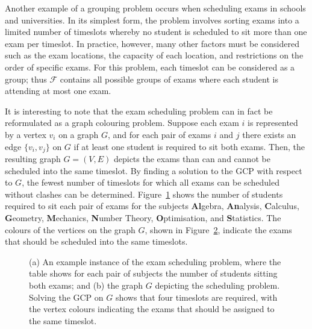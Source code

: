 \documentclass[a4paper,11pt]{article}
\begin{document}
Another example of a grouping problem occurs when scheduling exams in schools and universities. In its simplest form, the problem involves sorting exams into a limited number of timeslots whereby no student is scheduled to sit more than one exam per timeslot. In practice, however, many other factors must be considered such as the exam locations, the capacity of each location, and restrictions on the order of specific exams. For this problem, each timeslot can be considered as a group; thus $\mathcal{F}$ contains all possible groups of exams where each student is attending at most one exam.

It is interesting to note that the exam scheduling problem can in fact be reformulated as a graph colouring problem. Suppose each exam $i$ is represented by a vertex $v_i$ on a graph $G$, and for each pair of exams $i$ and $j$ there exists an edge $\{v_i, v_j\}$ on $G$ if at least one student is required to sit both exams. Then, the resulting graph $G = (V, E)$ depicts the exams than can and cannot be scheduled into the same timeslot. By finding a solution to the GCP with respect to $G$, the fewest number of timeslots for which all exams can be scheduled without clashes can be determined. Figure~\ref{fig:exams} shows the number of students required to sit each pair of exams for the subjects \textbf{Al}gebra, \textbf{An}alysis, \textbf{C}alculus, \textbf{G}eometry, \textbf{M}echanics, \textbf{N}umber Theory, \textbf{O}ptimisation, and \textbf{S}tatistics. The colours of the vertices on the graph $G$, shown in Figure~\ref{fig:gcp}, indicate the exams that should be scheduled into the same timeslots.

\begin{figure}[h!]
	\centering	
	\begin{subfigure}[b]{0.4\textwidth}
		
		\caption{}	
		\label{fig:exams}
	\end{subfigure} \hspace{5mm}
	\begin{subfigure}[b]{0.4\textwidth}
		
		\caption{}	
		\label{fig:gcp}
	\end{subfigure}
	\caption{(a) An example instance of the exam scheduling problem, where the table shows for each pair of subjects the number of students sitting both exams; and (b) the graph $G$ depicting the scheduling problem. Solving the GCP on $G$ shows that four timeslots are required, with the vertex colours indicating the exams that should be assigned to the same timeslot.}	
	\label{fig:groupingprobs}
\end{figure}
\end{document}
